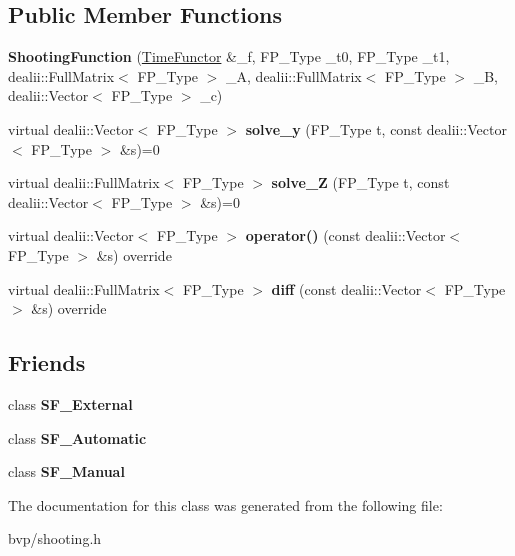 \subsection*{Public Member Functions}
\begin{DoxyCompactItemize}
\item 
\mbox{\label{classShootingFunction_ae73f34f210d7f6836b570ecca21f62c0}} 
{\bfseries Shooting\+Function} (\hyperlink{classTimeFunctor}{Time\+Functor} \&\+\_\+f, F\+P\+\_\+\+Type \+\_\+t0, F\+P\+\_\+\+Type \+\_\+t1, dealii\+::\+Full\+Matrix$<$ F\+P\+\_\+\+Type $>$ \+\_\+A, dealii\+::\+Full\+Matrix$<$ F\+P\+\_\+\+Type $>$ \+\_\+B, dealii\+::\+Vector$<$ F\+P\+\_\+\+Type $>$ \+\_\+c)
\item 
\mbox{\label{classShootingFunction_aa44df51be2d7e7171ff6c7908dc19105}} 
virtual dealii\+::\+Vector$<$ F\+P\+\_\+\+Type $>$ {\bfseries solve\+\_\+y} (F\+P\+\_\+\+Type t, const dealii\+::\+Vector$<$ F\+P\+\_\+\+Type $>$ \&s)=0
\item 
\mbox{\label{classShootingFunction_a1776eea4866a6d96e76e69986a5a887c}} 
virtual dealii\+::\+Full\+Matrix$<$ F\+P\+\_\+\+Type $>$ {\bfseries solve\+\_\+Z} (F\+P\+\_\+\+Type t, const dealii\+::\+Vector$<$ F\+P\+\_\+\+Type $>$ \&s)=0
\item 
\mbox{\label{classShootingFunction_a02ef732410cfd2168a865e550610d1cf}} 
virtual dealii\+::\+Vector$<$ F\+P\+\_\+\+Type $>$ {\bfseries operator()} (const dealii\+::\+Vector$<$ F\+P\+\_\+\+Type $>$ \&s) override
\item 
\mbox{\label{classShootingFunction_ae848d8431d042e8f1df5bff5f716ed38}} 
virtual dealii\+::\+Full\+Matrix$<$ F\+P\+\_\+\+Type $>$ {\bfseries diff} (const dealii\+::\+Vector$<$ F\+P\+\_\+\+Type $>$ \&s) override
\end{DoxyCompactItemize}
\subsection*{Friends}
\begin{DoxyCompactItemize}
\item 
\mbox{\label{classShootingFunction_a93dbf39ac4cbbc98d7d42b86d98179eb}} 
class {\bfseries S\+F\+\_\+\+External}
\item 
\mbox{\label{classShootingFunction_ab9857bb910ee9206e4888bdc358f0ecb}} 
class {\bfseries S\+F\+\_\+\+Automatic}
\item 
\mbox{\label{classShootingFunction_acf7e9fe888f96c8f5b3243c0848c0fcd}} 
class {\bfseries S\+F\+\_\+\+Manual}
\end{DoxyCompactItemize}


The documentation for this class was generated from the following file\+:\begin{DoxyCompactItemize}
\item 
bvp/shooting.\+h\end{DoxyCompactItemize}
